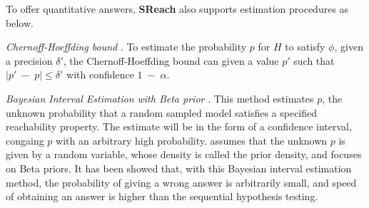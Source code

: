 To offer quantitative answers, {\bf SReach} also supports estimation procedures as below.

\textit{Chernoff-Hoeffding bound} \cite{hoeffding1963probability}. To estimate the probability $p$ for $H$ to satisfy $\phi$, given a precision $\delta'$, the Chernoff-Hoeffding bound can given a value $p'$ such that $|p' \; - \; p| \le \delta'$ with confidence $1\;-\; \alpha$.

\textit{Bayesian Interval Estimation with Beta prior} \cite{zuliani2010bayesian}. This method estimates $p$, the unknown probability that a random sampled model satisfies a specified reachability property. 
The estimate will be in the form of a confidence interval, congaing $p$ with an arbitrary high probability.  \cite{zuliani2010bayesian} assumes that the unknown $p$ is given by a random variable, whose density is called the prior density, and focuses on Beta priors. It has been showed that, with this Bayesian interval estimation method, the probability of giving a wrong answer is arbitrarily small, and speed of obtaining an answer is higher than the sequential hypothesis testing.
